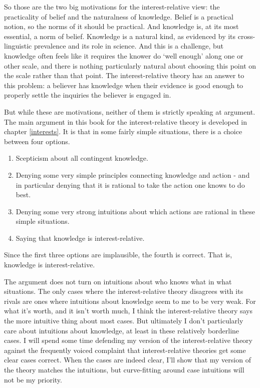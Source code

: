 \documentclass[
  11pt,
]{book}
\providecommand{\tightlist}{%
  \setlength{\itemsep}{0pt}\setlength{\parskip}{0pt}}
\begin{document}
So those are the two big motivations for the interest-relative view: the practicality of belief and the naturalness of knowledge. Belief is a practical notion, so the norms of it should be practical. And knowledge is, at its most essential, a norm of belief. Knowledge is a natural kind, as evidenced by its cross-linguistic prevalence and its role in science. And this is a challenge, but knowledge often feels like it requires the knower do `well enough' along one or other scale, and there is nothing particularly natural about choosing this point on the scale rather than that point. The interest-relative theory has an answer to this problem: a believer has knowledge when their evidence is good enough to properly settle the inquiries the believer is engaged in.

But while these are motivations, neither of them is strictly speaking at argument. The main argument in this book for the interest-relative theory is developed in chapter \ref{interests}. It is that in some fairly simple situations, there is a choice between four options.

\begin{enumerate}
\def\labelenumi{\arabic{enumi}.}
\tightlist
\item
  Scepticism about all contingent knowledge.
\item
  Denying some very simple principles connecting knowledge and action - and in particular denying that it is rational to take the action one knows to do best.
\item
  Denying some very strong intuitions about which actions are rational in these simple situations.
\item
  Saying that knowledge is interest-relative.
\end{enumerate}

Since the first three options are implausible, the fourth is correct. That is, knowledge is interest-relative.

The argument does not turn on intuitions about who knows what in what situations. The only cases where the interest-relative theory disagrees with its rivals are ones where intuitions about knowledge seem to me to be very weak. For what it's worth, and it isn't worth much, I think the interest-relative theory says the more intuitive thing about most cases. But ultimately I don't particularly care about intuitions about knowledge, at least in these relatively borderline cases. I will spend some time defending my version of the interest-relative theory against the frequently voiced complaint that interest-relative theories get some clear cases correct. When the cases are indeed clear, I'll show that my version of the theory matches the intuitions, but curve-fitting around case intuitions will not be my priority.
\end{document}
